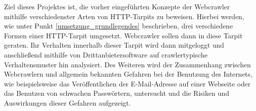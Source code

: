 Ziel dieses Projektes ist, die vorher eingeführten Konzepte der Webcrawler mithilfe verschiedenster Arten von HTTP-Tarpits zu beweisen. Hierbei werden, wie unter Punkt \ref{umsetzung_grundlegendes} beschrieben, drei verschiedene Formen einer HTTP-Tarpit umgesetzt. Webcrawler sollen dann in diese Tarpit geraten. Ihr Verhalten innerhalb dieser Tarpit wird dann mitgeloggt und anschließend mithilfe von Drittanbietersoftware auf crawlertypische Verhaltensmuster hin analysiert. Des Weiteren wird der Zusammenhang zwischen Webcrawlern und allgemein bekannten Gefahren bei der Benutzung des Internets, wie beispielsweise das Veröffentlichen der E-Mail-Adresse auf einer Webseite oder das Benutzen von schwachen Passwörtern, untersucht und die Risiken und Auswirkungen dieser Gefahren aufgezeigt.